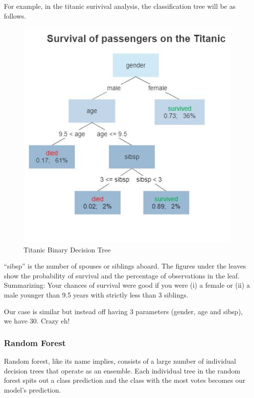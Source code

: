 \documentclass[
]{article}
\begin{document}
For example, in the titanic surivival analysis, the classification tree
will be as follows.

\begin{figure}
\centering
\includegraphics{./img/Decision_Tree.jpg}
\caption{Titanic Binary Decision Tree}
\end{figure}

``sibsp'' is the number of spouses or siblings aboard. The figures under
the leaves show the probability of survival and the percentage of
observations in the leaf. Summarizing: Your chances of survival were
good if you were (i) a female or (ii) a male younger than 9.5 years with
strictly less than 3 siblings.

Our case is similar but instead off having 3 parameters (gender, age and
sibsp), we have 30. Crazy eh!

\hypertarget{random-forest}{%
\subsubsection{Random Forest}\label{random-forest}}

Random forest, like its name implies, consists of a large number of
individual decision trees that operate as an ensemble. Each individual
tree in the random forest spits out a class prediction and the class
with the most votes becomes our model's prediction.
\end{document}
